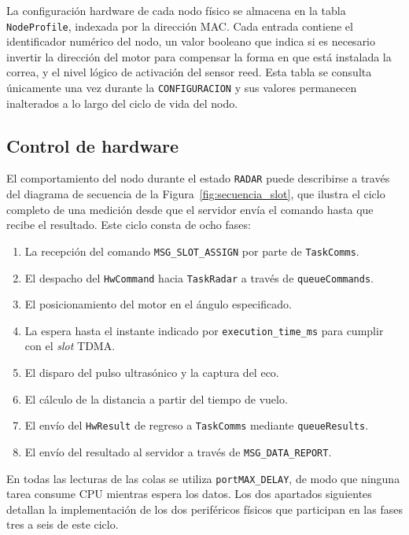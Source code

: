 La configuración hardware de cada nodo físico se almacena en la tabla \texttt{NodeProfile}, indexada por la dirección MAC. Cada entrada contiene el identificador numérico del nodo, un valor booleano que indica si es necesario invertir la dirección del motor para compensar la forma en que está instalada la correa, y el nivel lógico de activación del sensor reed. Esta tabla se consulta únicamente una vez durante la \texttt{CONFIGURACION} y sus valores permanecen inalterados a lo largo del ciclo de vida del nodo.

\subsection{Control de hardware}

El comportamiento del nodo durante el estado \texttt{RADAR} puede describirse a través del diagrama de secuencia de la Figura~\ref{fig:secuencia_slot}, que ilustra el ciclo completo de una medición desde que el servidor envía el comando hasta que recibe el resultado. Este ciclo consta de ocho fases:

\begin{enumerate}[topsep=4pt, partopsep=0pt, itemsep=2pt, parsep=0pt]
    \item La recepción del comando \texttt{MSG\_SLOT\_ASSIGN} por parte de \texttt{TaskComms}.
    \item El despacho del \texttt{HwCommand} hacia \texttt{TaskRadar} a través de \texttt{queueCommands}.
    \item El posicionamiento del motor en el ángulo especificado.
    \item La espera hasta el instante indicado por \texttt{execution\_time\_ms} para cumplir con el \textit{slot} TDMA.
    \item El disparo del pulso ultrasónico y la captura del eco.
    \item El cálculo de la distancia a partir del tiempo de vuelo.
    \item El envío del \texttt{HwResult} de regreso a \texttt{TaskComms} mediante \texttt{queueResults}.
    \item El envío del resultado al servidor a través de \texttt{MSG\_DATA\_REPORT}.
\end{enumerate}

En todas las lecturas de las colas se utiliza \texttt{portMAX\_DELAY}, de modo que ninguna tarea consume CPU mientras espera los datos. Los dos apartados siguientes detallan la implementación de los dos periféricos físicos que participan en las fases tres a seis de este ciclo.


